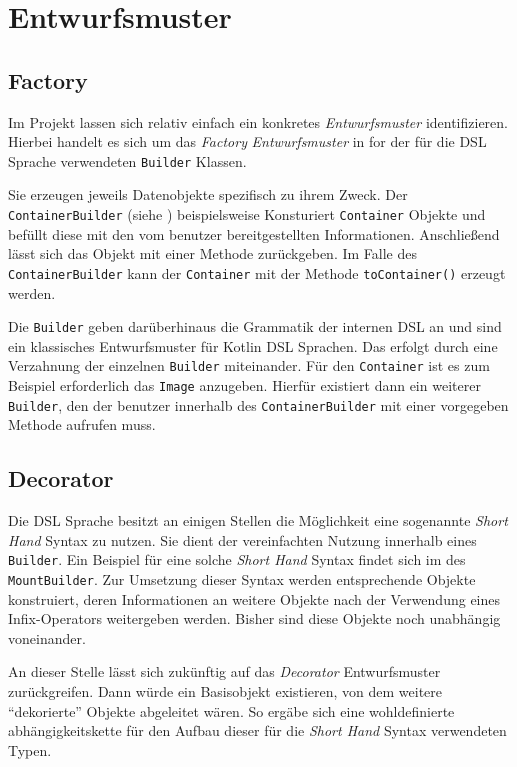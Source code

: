 \section{Entwurfsmuster}
\label{sec:entwurfsmuster}

\subsection{Factory}
\label{subsec:factory}

Im Projekt lassen sich relativ einfach ein konkretes \emph{Entwurfsmuster} identifizieren.
Hierbei handelt es sich um das \emph{Factory} \emph{Entwurfsmuster} in for der für die DSL Sprache verwendeten \texttt{Builder} Klassen.

Sie erzeugen jeweils Datenobjekte spezifisch zu ihrem Zweck.
Der \texttt{ContainerBuilder} (siehe ) beispielsweise Konsturiert \texttt{Container} Objekte und befüllt diese mit den vom benutzer bereitgestellten Informationen.
Anschließend lässt sich das Objekt mit einer Methode zurückgeben.
Im Falle des \texttt{ContainerBuilder} kann der \texttt{Container} mit der Methode \texttt{toContainer()} erzeugt werden.

Die \texttt{Builder} geben darüberhinaus die Grammatik der internen DSL an und sind ein klassisches Entwurfsmuster für Kotlin DSL Sprachen.
Das erfolgt durch eine Verzahnung der einzelnen \texttt{Builder} miteinander.
Für den \texttt{Container} ist es zum Beispiel erforderlich das \texttt{Image} anzugeben.
Hierfür existiert dann ein weiterer \texttt{Builder}, den der benutzer innerhalb des \texttt{ContainerBuilder} mit einer vorgegeben Methode aufrufen muss.

\subsection{Decorator}
\label{subsec:decorator}

Die DSL Sprache besitzt an einigen Stellen die Möglichkeit eine sogenannte \emph{Short Hand} Syntax zu nutzen.
Sie dient der vereinfachten Nutzung innerhalb eines \texttt{Builder}.
Ein Beispiel für eine solche \emph{Short Hand} Syntax findet sich im  des \texttt{MountBuilder}.
Zur Umsetzung dieser Syntax werden entsprechende Objekte konstruiert, deren Informationen an weitere Objekte nach der Verwendung eines Infix-Operators weitergeben werden.
Bisher sind diese Objekte noch unabhängig voneinander.

An dieser Stelle lässt sich zukünftig auf das \emph{Decorator} Entwurfsmuster zurückgreifen.
Dann würde ein Basisobjekt existieren, von dem weitere \enquote{dekorierte} Objekte abgeleitet wären.
So ergäbe sich eine wohldefinierte abhängigkeitskette für den Aufbau dieser für die \emph{Short Hand} Syntax verwendeten Typen.